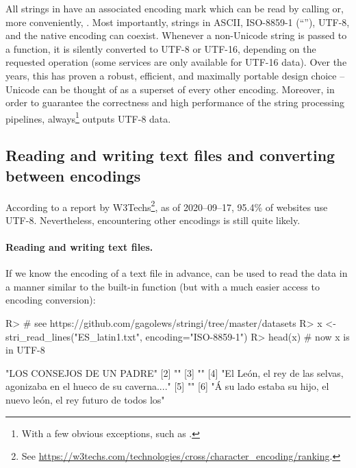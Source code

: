 \documentclass[nojss]{jss}
\begin{document}
All strings in  have an associated encoding mark
which can be read by calling  or, more conveniently,
.
Most importantly, strings in ASCII, ISO-8859-1 (``''),
UTF-8, and the native encoding can coexist.
Whenever a non-Unicode string is passed to a  function,
it is silently converted to UTF-8 or UTF-16, depending on the requested
operation (some  services are only available for {UTF-16} data).
Over the years, this has proven a robust, efficient, and maximally portable
design choice -- Unicode can be thought of as a superset of every other encoding.
Moreover, in order to guarantee the correctness and high performance of
the string processing pipelines,  always\footnote{With a few
obvious exceptions, such as .} outputs
UTF-8 data.


\subsection{Reading and writing text files and converting between encodings}\label{Sec:read_lines}

According to a report by W3Techs\footnote{See
\url{https://w3techs.com/technologies/cross/character_encoding/ranking}.},
as of 2020--09--17, 95.4\% of websites use UTF-8.
Nevertheless, encountering other encodings is still quite likely.

\paragraph{Reading and writing text files.}
If we know the encoding of a text file  in advance,
 can be used to read
the data in a manner similar to the built-in  function
(but with a much easier access to encoding conversion):

\begin{Schunk}
\begin{Sinput}
R> # see https://github.com/gagolews/stringi/tree/master/datasets
R> x <- stri_read_lines("ES_latin1.txt", encoding="ISO-8859-1")
R> head(x)  # now x is in UTF-8
\end{Sinput}
\begin{Soutput}
[1] "LOS CONSEJOS DE UN PADRE"
[2] ""
[3] ""
[4] "El León, el rey de las selvas, agonizaba en el hueco de su caverna...."
[5] ""
[6] "Á su lado estaba su hijo, el nuevo león, el rey futuro de todos los"
\end{Soutput}
\end{Schunk}
\end{document}
